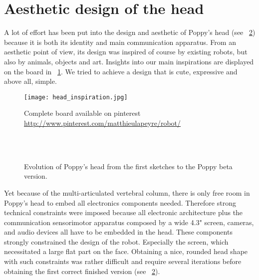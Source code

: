 
\section{ Aesthetic design of the head } %
\label{sec:head-design}
A lot of effort has been put into the design and aesthetic of Poppy's head (see \figurename~\ref{fig:poppy_head_beta}) because it is both its identity and main communication apparatus.
From an aesthetic point of view, its design was inspired of course by existing robots, but also by animals, objects and art. Insights into our  main inspirations are displayed on the board in \figurename~\ref{fig:head_inspiration}. We tried to achieve a design that is cute, expressive and above all, simple.

\begin{figure}[p]
    \begin{center}
        \texttt{[image: head\_inspiration.jpg]}
    \end{center}
    \caption{Complete board available on pinterest \url{http://www.pinterest.com/matthieulapeyre/robot/}}
    \label{fig:head_inspiration}
\end{figure}

\begin{figure}[p]
\centering
    \hfill
    \\
    \hfill
    \\
    \hfill
    \caption{Evolution of Poppy’s head from the first sketches to the Poppy beta version.}
    \label{fig:poppy_head_beta}
\end{figure}

Yet because of the multi-articulated vertebral column, there is only free room in Poppy’s head to embed all electronics components needed. Therefore strong technical constraints were imposed because all electronic architecture plus the communication sensorimotor apparatus composed by a wide 4.3" screen, cameras, and audio devices all have to be embedded in the head.
These components strongly constrained the design of the robot. Especially the screen, which necessitated a large flat part on the face. Obtaining a nice, rounded head shape with such constraints was rather difficult and require several iterations before obtaining the first correct finished version (see \figurename~\ref{fig:poppy_head_beta}).


